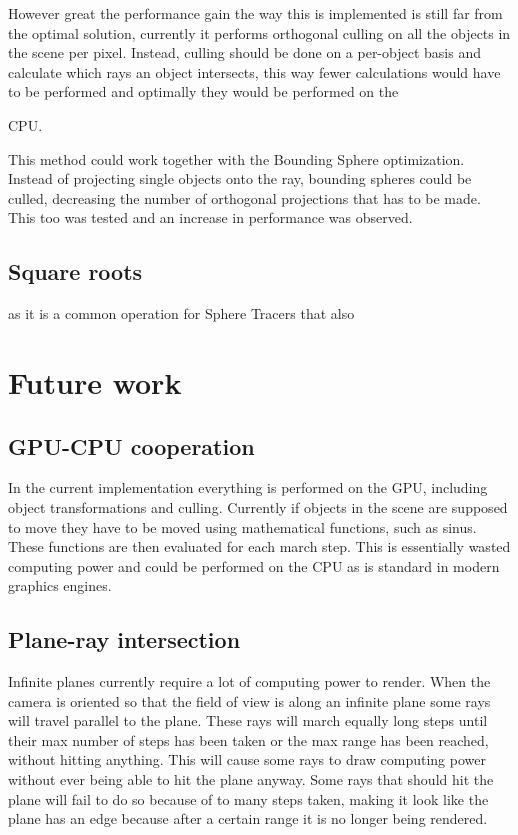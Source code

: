 			However great the performance gain the way this is implemented
			is still far from the optimal solution, currently it performs orthogonal culling on all the objects in the scene per pixel. Instead,
            culling should be done on a per-object basis and calculate
            which rays an object intersects, this way fewer calculations would
            have to be performed and optimally they would be performed on the

			CPU.

			This method could work together with the Bounding Sphere 
			optimization. Instead of projecting single objects onto the ray,
			bounding spheres could be culled, decreasing the number of 
			orthogonal projections that has to be made. This too was tested 
			and an increase in performance was observed.

		\subsection{Square roots}

			as it is a common operation for Sphere Tracers that also
		

	\section{Future work}

		\subsection{GPU-CPU cooperation}

            In the current implementation everything is performed on the GPU,
            including object transformations and culling. Currently if objects 
            in the scene are supposed to move they have to be moved using 
            mathematical functions, such as sinus. These functions are then evaluated for each march step. This is essentially wasted computing power and could be performed on the CPU as is standard in modern graphics engines.



		\subsection{Plane-ray intersection}

			Infinite planes currently require a lot of computing power to
			render. When the camera is oriented so that the field of view is
			along an infinite plane some rays will travel parallel to the
			plane. These rays will march equally long steps until their max
			number of steps has been taken or the max range has been reached, without hitting anything. This will cause some rays to draw computing power without ever being able to hit the plane anyway. Some rays that should hit the plane will fail to do so because of to many steps taken, making it look like the plane has an edge because after a certain range it is no longer being rendered.


